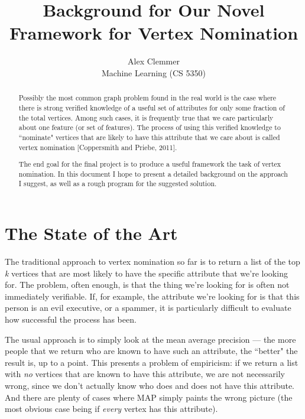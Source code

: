 \documentclass[11pt]{article}
\title{Background for Our Novel Framework for Vertex Nomination}
\author{Alex Clemmer \\ Machine Learning (CS 5350)}
\begin{document}
\lstset{language=C++,basicstyle=\small,
        stringstyle=\ttfamily,showstringspaces=false}

\singlespace
\maketitle

\begin{abstract}                %
Possibly the most common graph problem found in the real world is the case where there is strong verified knowledge of a useful set of attributes for only some fraction of the total vertices. Among such cases, it is frequently true that we care particularly about one feature (or set of features). The process of using this verified knowledge to ``nominate" vertices that are likely to have this attribute that we care about is called vertex nomination [Coppersmith and Priebe, 2011].

The end goal for the final project is to produce a useful framework the task of vertex nomination. In this document I hope to present a detailed background on the approach I suggest, as well as a rough program for the suggested solution.
\end{abstract}

\doublespace
\setcounter{secnumdepth}{2}

\section{The State of the Art}\label{ch:overview}

The traditional approach to vertex nomination so far is to return a list of the top \textit{k} vertices that are most likely to have the specific attribute that we're looking for. The problem, often enough, is that the thing we're looking for is often not immediately verifiable. If, for example, the attribute we're looking for is that this person is an evil executive, or a spammer, it is particularly difficult to evaluate how successful the process has been.

The usual approach is to simply look at the mean average precision --- the more people that we return who are known to have such an attribute, the ``better" the result is, up to a point. This presents a problem of empiricism: if we return a list with \textit{no} vertices that are known to have this attribute, we are not necessarily wrong, since we don't actually know who does and does not have this attribute. And there are plenty of cases where MAP simply paints the wrong picture (the most obvious case being if \textit{every} vertex has this attribute).
\end{document}

